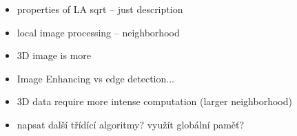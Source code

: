 \documentclass[oneside]{article}
\newcommand{\beI}{\begin{itemize}}
\newcommand{\enI}{\end{itemize}}
\begin{document}
\beI
    \item properties of LA sqrt -- just description
    \item local image processing -- neighborhood 
    \item 3D image is more 
\enI

\begin{itemize}
    \item Image Enhancing vs edge detection...
    \item 3D data require more intense computation (larger neighborhood)
    \item napsat další třídící algoritmy? využít globální paměť?
\end{itemize}
\end{document}
